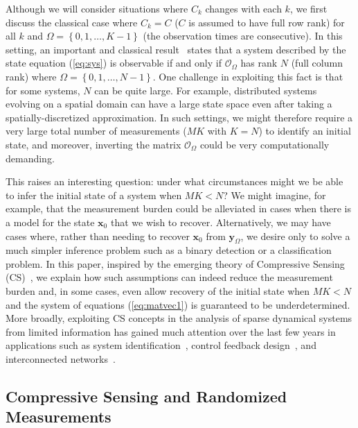 \documentclass[11pt,draftcls,onecolumn]{IEEEtran}
\newcommand{\vc}[1]{\boldsymbol{#1}}
\begin{document}
Although we will consider situations where $C_k$ changes with each $k$, we first discuss the classical case where $C_k = C$ ($C$ is assumed to have full row rank) for all $k$ and $\Omega = \left\{0,1,\dots,K-1\right\}$ (the observation times are consecutive). In this setting, an important and classical result~\cite{Chen99} states that a system described by the state equation (\ref{eq:sys}) is observable if and only if $\mathcal{O}_{\Omega}$ has rank $N$ (full column rank) where $\Omega = \left\{0,1,\dots,N-1\right\}$. One challenge in exploiting this fact is that for some systems, $N$ can be quite large. For example, distributed systems evolving on a spatial domain can have a large state space even after taking a spatially-discretized approximation.
In such settings, we might therefore require a very large total number of measurements ($MK$ with $K=N$) to identify an initial state, and moreover, inverting the matrix $\mathcal{O}_{\Omega}$ could be very computationally demanding.

This raises an interesting question: under what circumstances might we be able to infer the initial state of a system when $MK < N$?
We might imagine, for example, that the measurement burden could be alleviated in cases
when there is a model for the state $\vc{x}_0$ that we wish to recover. Alternatively, we may have cases where, rather than needing to recover $\vc{x}_0$ from $\vc{y}_{\Omega}$, we desire only to solve a much simpler inference problem such as a binary detection or a classification problem. In this paper, inspired by the emerging theory of Compressive Sensing (CS)~\cite{CompSenDon,CompSampCand,candes2008people}, we explain how such assumptions can indeed reduce the measurement burden and, in some cases, even allow recovery of the initial state when $MK < N$ and the system of equations (\ref{eq:matvec1}) is guaranteed to be underdetermined. More broadly, exploiting CS concepts in the analysis of sparse dynamical systems from limited information has gained much attention over the last few years in applications such as system identification~\cite{ohlsson2010segmentation,toth2011csi,sanandaji2012thesis,shah2012linear}, control feedback design~\cite{zhao2012stability}, and interconnected networks~\cite{sanandaji2011cti,pan2012reconstruction}.


\subsection{Compressive Sensing and Randomized Measurements}
\end{document}
